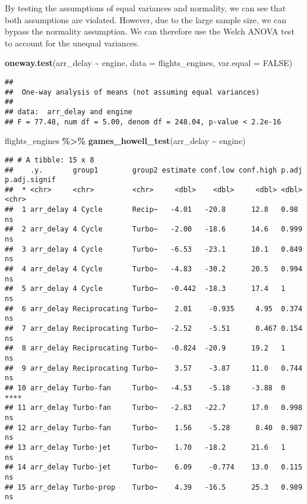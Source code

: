 \documentclass[
]{article}
\newenvironment{Shaded}{\begin{snugshade}}{\end{snugshade}}
\newcommand{\AttributeTok}[1]{\textcolor[rgb]{0.13,0.29,0.53}{#1}}
\newcommand{\ConstantTok}[1]{\textcolor[rgb]{0.56,0.35,0.01}{#1}}
\newcommand{\FunctionTok}[1]{\textcolor[rgb]{0.13,0.29,0.53}{\textbf{#1}}}
\newcommand{\NormalTok}[1]{#1}
\newcommand{\SpecialCharTok}[1]{\textcolor[rgb]{0.81,0.36,0.00}{\textbf{#1}}}
\begin{document}
By testing the assumptions of equal variances and normality, we can see
that both assumptions are violated. However, due to the large sample
size, we can bypass the normality assumption. We can therefore use the
Welch ANOVA test to account for the unequal variances.

\begin{Shaded}
\begin{Highlighting}[]
\FunctionTok{oneway.test}\NormalTok{(arr\_delay }\SpecialCharTok{\textasciitilde{}}\NormalTok{ engine, }\AttributeTok{data =}\NormalTok{ flights\_engines, }\AttributeTok{var.equal =} \ConstantTok{FALSE}\NormalTok{)}
\end{Highlighting}
\end{Shaded}

\begin{verbatim}
## 
##  One-way analysis of means (not assuming equal variances)
## 
## data:  arr_delay and engine
## F = 77.48, num df = 5.00, denom df = 248.04, p-value < 2.2e-16
\end{verbatim}

\begin{Shaded}
\begin{Highlighting}[]
\NormalTok{flights\_engines }\SpecialCharTok{\%\textgreater{}\%}
  \FunctionTok{games\_howell\_test}\NormalTok{(arr\_delay }\SpecialCharTok{\textasciitilde{}}\NormalTok{ engine)}
\end{Highlighting}
\end{Shaded}

\begin{verbatim}
## # A tibble: 15 x 8
##    .y.       group1        group2 estimate conf.low conf.high p.adj p.adj.signif
##  * <chr>     <chr>         <chr>     <dbl>    <dbl>     <dbl> <dbl> <chr>       
##  1 arr_delay 4 Cycle       Recip~   -4.01   -20.8      12.8   0.98  ns          
##  2 arr_delay 4 Cycle       Turbo~   -2.00   -18.6      14.6   0.999 ns          
##  3 arr_delay 4 Cycle       Turbo~   -6.53   -23.1      10.1   0.849 ns          
##  4 arr_delay 4 Cycle       Turbo~   -4.83   -30.2      20.5   0.994 ns          
##  5 arr_delay 4 Cycle       Turbo~   -0.442  -18.3      17.4   1     ns          
##  6 arr_delay Reciprocating Turbo~    2.01    -0.935     4.95  0.374 ns          
##  7 arr_delay Reciprocating Turbo~   -2.52    -5.51      0.467 0.154 ns          
##  8 arr_delay Reciprocating Turbo~   -0.824  -20.9      19.2   1     ns          
##  9 arr_delay Reciprocating Turbo~    3.57    -3.87     11.0   0.744 ns          
## 10 arr_delay Turbo-fan     Turbo~   -4.53    -5.18     -3.88  0     ****        
## 11 arr_delay Turbo-fan     Turbo~   -2.83   -22.7      17.0   0.998 ns          
## 12 arr_delay Turbo-fan     Turbo~    1.56    -5.28      8.40  0.987 ns          
## 13 arr_delay Turbo-jet     Turbo~    1.70   -18.2      21.6   1     ns          
## 14 arr_delay Turbo-jet     Turbo~    6.09    -0.774    13.0   0.115 ns          
## 15 arr_delay Turbo-prop    Turbo~    4.39   -16.5      25.3   0.989 ns
\end{verbatim}
\end{document}
